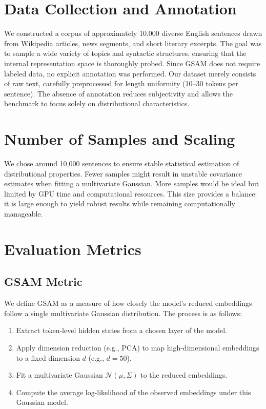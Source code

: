 \documentclass[11pt,letterpaper]{article}
\begin{document}
\section{Data Collection and Annotation}

We constructed a corpus of approximately 10,000 diverse English sentences drawn from Wikipedia articles, news segments, and short literary excerpts. The goal was to sample a wide variety of topics and syntactic structures, ensuring that the internal representation space is thoroughly probed. Since GSAM does not require labeled data, no explicit annotation was performed. Our dataset merely consists of raw text, carefully preprocessed for length uniformity (10--30 tokens per sentence). The absence of annotation reduces subjectivity and allows the benchmark to focus solely on distributional characteristics.

\section{Number of Samples and Scaling}

We chose around 10,000 sentences to ensure stable statistical estimation of distributional properties. Fewer samples might result in unstable covariance estimates when fitting a multivariate Gaussian. More samples would be ideal but limited by GPU time and computational resources. This size provides a balance: it is large enough to yield robust results while remaining computationally manageable.

\section{Evaluation Metrics}

\subsection{GSAM Metric}

We define GSAM as a measure of how closely the model's reduced embeddings follow a single multivariate Gaussian distribution. The process is as follows:

\begin{enumerate}
    \item Extract token-level hidden states from a chosen layer of the model.
    \item Apply dimension reduction (e.g., PCA) to map high-dimensional embeddings to a fixed dimension $d$ (e.g., $d=50$).
    \item Fit a multivariate Gaussian $\mathcal{N}(\mu, \Sigma)$ to the reduced embeddings.
    \item Compute the average log-likelihood of the observed embeddings under this Gaussian model.
\end{enumerate}
\end{document}
